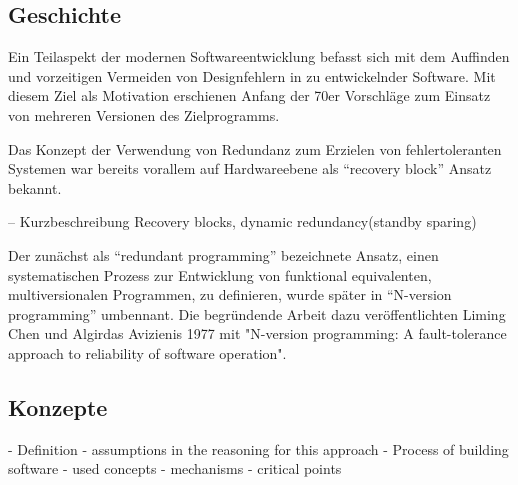 \subsection{Geschichte}\label{geschichte}

Ein Teilaspekt der modernen Softwareentwicklung befasst sich mit dem Auffinden und vorzeitigen Vermeiden von Designfehlern in zu entwickelnder Software. Mit diesem Ziel als Motivation erschienen Anfang der 70er Vorschläge zum Einsatz von mehreren Versionen des Zielprogramms. 

Das Konzept der Verwendung von Redundanz zum Erzielen von fehlertoleranten Systemen war bereits vorallem auf Hardwareebene als \enquote{recovery block} Ansatz bekannt.

-- Kurzbeschreibung Recovery blocks, dynamic redundancy(standby sparing)

Der zunächst als \enquote{redundant programming} bezeichnete Ansatz, einen systematischen Prozess zur Entwicklung von funktional equivalenten, multiversionalen Programmen, zu definieren, wurde später in \enquote{N-version programming} umbennant.
Die begründende Arbeit dazu veröffentlichten Liming Chen und Algirdas Avizienis 1977 mit "N-version programming: A fault-tolerance approach to reliability of software operation".
%
%
%


\subsection{Konzepte}

- Definition
- assumptions in the reasoning for this approach
- Process of building software
- used concepts
- mechanisms
- critical points


